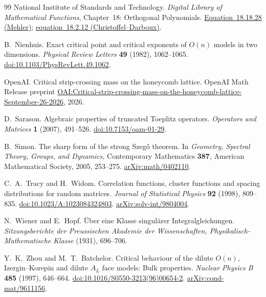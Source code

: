 \begin{thebibliography}{99}
National Institute of Standards and Technology.
\emph{Digital Library of Mathematical Functions}, Chapter~18:
Orthogonal Polynomials.
\href{https://dlmf.nist.gov/18.18.E28}{Equation~18.18.28 (Mehler)};
\href{https://dlmf.nist.gov/18.2.E12}{equation~18.2.12 (Christoffel--Darboux)}.

B.~Nienhuis.
Exact critical point and critical exponents of $O(n)$ models in two dimensions.
\emph{Physical Review Letters} \textbf{49} (1982), 1062--1065.
\href{https://doi.org/10.1103/PhysRevLett.49.1062}{doi:10.1103/PhysRevLett.49.1062}.

OpenAI.
Critical strip-crossing mass on the honeycomb lattice.
OpenAI Math Release preprint
\href{https://github.com/openai/math/blob/main/preprints/Critical-strip-crossing-mass-on-the-honeycomb-lattice-September-26-2026/main.pdf}{OAI:Critical-strip-crossing-mass-on-the-honeycomb-lattice-September-26-2026},
2026.

D.~Sarason. Algebraic properties of truncated Toeplitz operators.
\emph{Operators and Matrices} \textbf{1} (2007), 491--526.
\href{https://doi.org/10.7153/oam-01-29}{doi:10.7153/oam-01-29}.

B.~Simon. The sharp form of the strong Szeg\H{o} theorem.
In \emph{Geometry, Spectral Theory, Groups, and Dynamics},
Contemporary Mathematics \textbf{387}, American Mathematical Society,
2005, 253--275.
\href{https://arxiv.org/abs/math/0402110}{arXiv:math/0402110}.

C.~A.~Tracy and H.~Widom.
Correlation functions, cluster functions and spacing distributions
for random matrices.
\emph{Journal of Statistical Physics} \textbf{92} (1998), 809--835.
\href{https://doi.org/10.1023/A:1023084324803}{doi:10.1023/A:1023084324803}.
\href{https://arxiv.org/abs/solv-int/9804004}{arXiv:solv-int/9804004}.

N.~Wiener and E.~Hopf.
\"Uber eine Klasse singul\"arer Integralgleichungen.
\emph{Sitzungsberichte der Preussischen Akademie der Wissenschaften,
Physikalisch-Mathematische Klasse} (1931), 696--706.

Y.~K.~Zhou and M.~T.~Batchelor.
Critical behaviour of the dilute $O(n)$, Izergin--Korepin and dilute
$A_L$ face models: Bulk properties.
\emph{Nuclear Physics B} \textbf{485} (1997), 646--664.
\href{https://doi.org/10.1016/S0550-3213(96)00654-2}{doi:10.1016/S0550-3213(96)00654-2}.
\href{https://arxiv.org/abs/cond-mat/9611156}{arXiv:cond-mat/9611156}.
\end{thebibliography}

